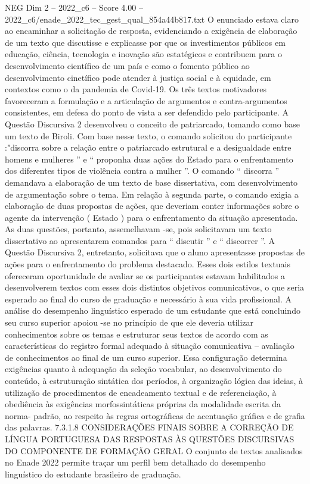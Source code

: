 \begin{textsample}{NEG Dim 2 – 2022\_c6 – Score 4.00 – 2022\_c6/enade\_2022\_tec\_gest\_qual\_854a44b817.txt}
O enunciado estava claro ao encaminhar a solicitação de resposta, evidenciando a exigência de elaboração de um texto que discutisse e explicasse por que os investimentos públicos em educação, ciência, tecnologia e inovação são estatégicos e contribuem para o desenvolvimento científico de um país e como o fomento público ao desenvolvimento cinetífico pode atender à justiça social e à equidade, em contextos como o da pandemia de Covid-19.
Os três textos motivadores favoreceram a formulação e a articulação de argumentos e contra-argumentos consistentes, em defesa do ponto de vista a ser defendido pelo participante.
A Questão Discursiva 2 desenvolveu o conceito de patriarcado, tomando como base um texto de Biroli.
Com base nesse texto, o comando solicitou do participante :"discorra sobre a relação entre o patriarcado estrutural e a desigualdade entre homens e mulheres ” e “ proponha duas ações do Estado para o enfrentamento dos diferentes tipos de violência contra a mulher ”.
O comando “ discorra ” demandava a elaboração de um texto de base dissertativa, com desenvolvimento de argumentação sobre o tema.
Em relação à segunda parte, o comando exigia a elaboração de duas propostas de ações, que deveriam conter informações sobre o agente da intervenção ( Estado ) para o enfrentamento da situação apresentada.
As duas questões, portanto, assemelhavam -se, pois solicitavam um texto dissertativo ao apresentarem comandos para “ discutir ” e “ discorrer ”.
A Questão Discursiva 2, entretanto, solicitava que o aluno apresentasse propostas de ações para o enfrentamento do problema destacado.
Esses dois estilos textuais ofereceram oportunidade de avaliar se os participantes estavam habilitados a desenvolverem textos com esses dois distintos objetivos comunicativos, o que seria esperado ao final do curso de graduação e necessário à sua vida profissional.
A análise do desempenho linguístico esperado de um estudante que está concluindo seu curso superior apoiou -se no princípio de que ele deveria utilizar conhecimentos sobre os temas e estruturar seus textos de acordo com as características do registro formal adequado à situação comunicativa – avaliação de conhecimentos ao final de um curso superior.
Essa configuração determina exigências quanto à adequação da seleção vocabular, ao desenvolvimento do conteúdo, à estruturação sintática dos períodos, à organização lógica das ideias, à utilização de procedimentos de encadeamento textual e de referenciação, à obediência às exigências morfossintáticas próprias da modalidade escrita da norma- padrão, ao respeito às regras ortográficas de acentuação gráfica e de grafia das palavras. 7.3.1.8 CONSIDERAÇÕES FINAIS SOBRE A CORREÇÃO DE LÍNGUA PORTUGUESA DAS RESPOSTAS ÀS QUESTÕES DISCURSIVAS DO COMPONENTE DE FORMAÇÃO GERAL O conjunto de textos analisados no Enade 2022 permite traçar um perfil bem detalhado do desempenho linguístico do estudante brasileiro de graduação.

\end{textsample}
